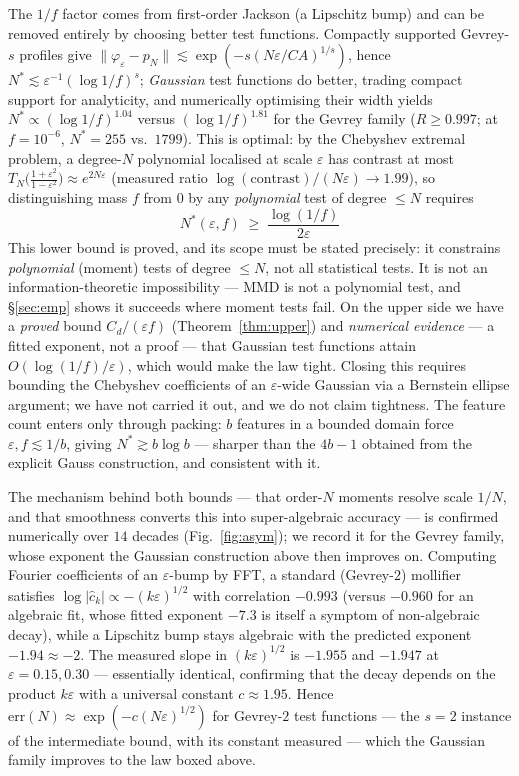 \documentclass[11pt]{article}
\theoremstyle{remark}
\begin{document}
The $1/f$ factor comes from first-order Jackson (a Lipschitz bump) and can be removed entirely by
choosing better test functions. Compactly supported Gevrey-$s$ profiles give
$\lVert\varphi_\varepsilon-p_N\rVert\lesssim\exp(-s(N\varepsilon/CA)^{1/s})$, hence
$N^*\lesssim\varepsilon^{-1}(\log 1/f)^{s}$; \emph{Gaussian} test functions do better, trading
compact support for analyticity, and numerically optimising their width yields
$N^*\propto(\log 1/f)^{1.04}$ versus $(\log 1/f)^{1.81}$ for the Gevrey family
($R\ge0.997$; at $f=10^{-6}$, $N^*=255$ vs.\ $1799$). This is optimal: by the Chebyshev extremal
problem, a degree-$N$ polynomial localised at scale $\varepsilon$ has contrast at most
$T_N\!\big(\tfrac{1+\varepsilon^2}{1-\varepsilon^2}\big)\approx e^{2N\varepsilon}$ (measured ratio
$\log(\text{contrast})/(N\varepsilon)\to1.99$), so distinguishing mass $f$ from $0$ by any \emph{polynomial} test of degree $\le N$ requires
\[
\boxed{\;N^*(\varepsilon,f)\;\ge\;\frac{\log(1/f)}{2\varepsilon}\;}
\]
This lower bound is proved, and its scope must be stated precisely: it constrains \emph{polynomial} (moment) tests of degree $\le N$, not all statistical tests. It is not an information-theoretic impossibility --- MMD is not a polynomial test, and \S\ref{sec:emp} shows it succeeds where moment tests fail. On the upper side we have a \emph{proved} bound $C_d/(\varepsilon f)$
(Theorem~\ref{thm:upper}) and \emph{numerical evidence} --- a fitted exponent, not a proof --- that Gaussian test
functions attain $O(\log(1/f)/\varepsilon)$, which would make the law tight. Closing this requires
bounding the Chebyshev coefficients of an $\varepsilon$-wide Gaussian via a Bernstein ellipse
argument; we have not carried it out, and we do not claim tightness.
The feature count enters only through packing: $b$ features in a bounded domain force
$\varepsilon,f\lesssim1/b$, giving $N^*\gtrsim b\log b$ --- sharper than the $4b-1$ obtained from
the explicit Gauss construction, and consistent with it.

The mechanism behind both bounds --- that order-$N$ moments resolve scale $1/N$, and that
smoothness converts this into super-algebraic accuracy --- is confirmed numerically over $14$
decades (Fig.~\ref{fig:asym}); we record it for the Gevrey family, whose exponent the Gaussian
construction above then improves on. Computing
Fourier coefficients of an $\varepsilon$-bump by FFT, a standard (Gevrey-$2$) mollifier satisfies
$\log|\hat c_k|\propto -(k\varepsilon)^{1/2}$ with correlation $-0.993$ (versus $-0.960$ for an
algebraic fit, whose fitted exponent $-7.3$ is itself a symptom of non-algebraic decay), while a
Lipschitz bump stays algebraic with the predicted exponent $-1.94\approx-2$. The measured slope in
$(k\varepsilon)^{1/2}$ is $-1.955$ and $-1.947$ at $\varepsilon=0.15,0.30$ --- essentially
identical, confirming that the decay depends on the product $k\varepsilon$ with a universal
constant $c\approx1.95$. Hence $\mathrm{err}(N)\approx\exp(-c(N\varepsilon)^{1/2})$ for Gevrey-$2$ test
functions --- the $s=2$ instance of the intermediate bound, with its constant measured --- which
the Gaussian family improves to the law boxed above.
\end{document}
